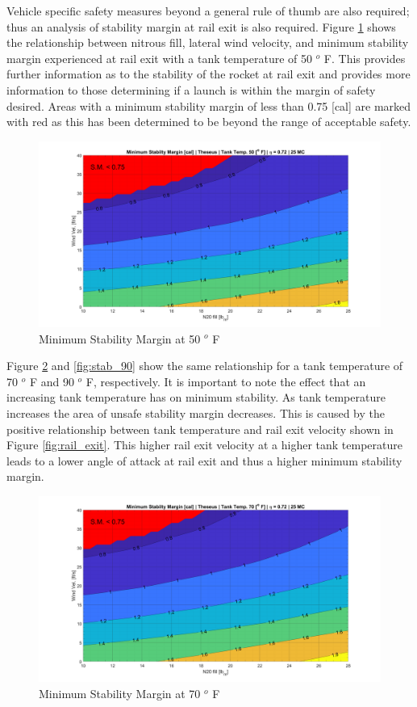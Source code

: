 \documentclass[10pt,a4paper]{article}
\begin{document}
 Vehicle specific safety measures beyond a general rule of thumb are also required; thus an analysis of stability margin at rail exit is also required. Figure \ref{fig:stab_50} shows the relationship between nitrous fill, lateral wind velocity, and minimum stability margin experienced at rail exit with a tank temperature of 50 $^o$ F. This provides further information as to the stability of the rocket at rail exit and provides more information to those determining if a launch is within the margin of safety desired. Areas with a minimum stability margin of less than 0.75 [cal] are marked with red as this has been determined to be beyond the range of acceptable safety.
 \begin{figure}[H]
 	\centering
 	\includegraphics[width=1\textwidth]{./figs/stab_50.png}
 	\caption{Minimum Stability Margin at 50 $^o$ F}
 	\label{fig:stab_50}
 \end{figure}
 
 Figure \ref{fig:stab_70} and \ref{fig:stab_90} show the same relationship for a tank temperature of 70 $^o$ F and 90 $^o$ F, respectively. It is important to note the effect that an increasing tank temperature has on minimum stability. As tank temperature increases the area of unsafe stability margin decreases. This is caused by the positive relationship between tank temperature and rail exit velocity shown in Figure \ref{fig:rail_exit}. This higher rail exit velocity at a higher tank temperature leads to a lower angle of attack at rail exit and thus a higher minimum stability margin.
 
  \begin{figure}[h!]
 	\centering
 	\includegraphics[width=1\textwidth]{./figs/stab_70.png}
 	\caption{Minimum Stability Margin at 70 $^o$ F}
 	\label{fig:stab_70}
 \end{figure}
\end{document}
